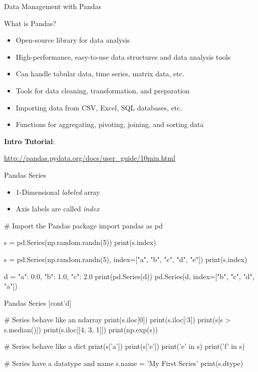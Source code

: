 \documentclass[ignorenonframetext,xcolor=x11names]{beamer}
\begin{document}
\begin{frame}{Data Management with Pandas}
\begin{block}{What is Pandas?}
\begin{itemize}
    \item Open-source library for data analysis
    \item High-performance, easy-to-use data structures and data analysis tools    
    \item Can handle tabular data, time series, matrix data, etc.
    \item Tools for data cleaning, transformation, and preparation    
    \item Importing data from CSV, Excel, SQL databases, etc.    
    \item Functions for aggregating, pivoting, joining, and sorting data
\end{itemize}
\end{block}
\vspace{5mm}
\textbf{Intro Tutorial}: 

\url{http://pandas.pydata.org/docs/user_guide/10min.html}
\end{frame}


\begin{frame}[fragile]{Pandas Series}
\begin{itemize}
    \item 1-Dimensional \emph{labeled} array
    \item Axis labels are called \emph{index}
\end{itemize}
\footnotesize
\begin{pythoncode}
# Import the Pandas package
import pandas as pd

s = pd.Series(np.random.randn(5))
print(s.index)

s = pd.Series(np.random.randn(5), 
              index=["a", "b", "c", "d", "e"])
print(s.index)

d = {"a": 0.0, "b": 1.0, "c": 2.0}
print(pd.Series(d))
pd.Series(d, index=["b", "c", "d", "a"])
\end{pythoncode}
\end{frame}

\begin{frame}[fragile]{Pandas Series \small [cont'd]}
\footnotesize
\begin{pythoncode}
# Series behave like an ndarray
print(s.iloc[0])
print(s.iloc[:3])
print(s[s > s.median()])
print(s.iloc[[4, 3, 1]])
print(np.exp(s))

# Series behave like a dict
print(s['a'])
print(s['e'])
print('e' in s)
print('f' in s)

# Series have a datatype and name
s.name = 'My First Series'
print(s.dtype)
\end{pythoncode}
\end{frame}
\end{document}
